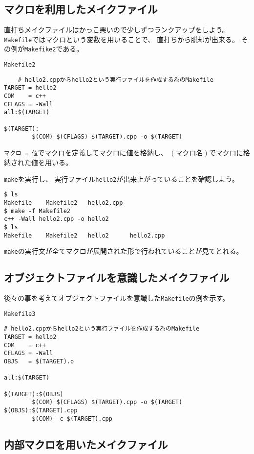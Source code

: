 \clearpage
 \subsection{マクロを利用したメイクファイル}
 直打ちメイクファイルはかっこ悪いので少しずつランクアップをしよう。
 \texttt{Makefile}ではマクロという変数を用いることで、
 直打ちから脱却が出来る。
 その例が\texttt{Makefike2}である。
\begin{itembox}{\texttt{Makefile2}}
 \begin{verbatim}
	# hello2.cppからhello2という実行ファイルを作成する為のMakefile
TARGET = hello2
COM    = c++
CFLAGS = -Wall
all:$(TARGET)

$(TARGET):
        $(COM) $(CFLAGS) $(TARGET).cpp -o $(TARGET)
 \end{verbatim}
\end{itembox}
\texttt{マクロ = 値}でマクロを定義してマクロに値を格納し、
\texttt{$(マクロ名)$}でマクロに格納された値を用いる。

\verb|make|を実行し、
実行ファイル\texttt{hello2}が出来上がっていることを確認しよう。
\begin{verbatim}
$ ls
Makefile	Makefile2	hello2.cpp
$ make -f Makefile2
c++ -Wall hello2.cpp -o hello2
$ ls
Makefile	Makefile2	hello2		hello2.cpp
\end{verbatim}
\verb|make|の実行文が全てマクロが展開された形で行われていることが見てとれる。


\subsection{オブジェクトファイルを意識したメイクファイル}

後々の事を考えてオブジェクトファイルを意識した\texttt{Makefile}の例を示す。
\begin{itembox}{\texttt{Makefile3}}
\begin{verbatim}
# hello2.cppからhello2という実行ファイルを作成する為のMakefile
TARGET = hello2
COM    = c++
CFLAGS = -Wall
OBJS   = $(TARGET).o

all:$(TARGET)

$(TARGET):$(OBJS)
        $(COM) $(CFLAGS) $(TARGET).cpp -o $(TARGET)
$(OBJS):$(TARGET).cpp
        $(COM) -c $(TARGET).cpp
\end{verbatim}
\end{itembox}

\subsection{内部マクロを用いたメイクファイル}

